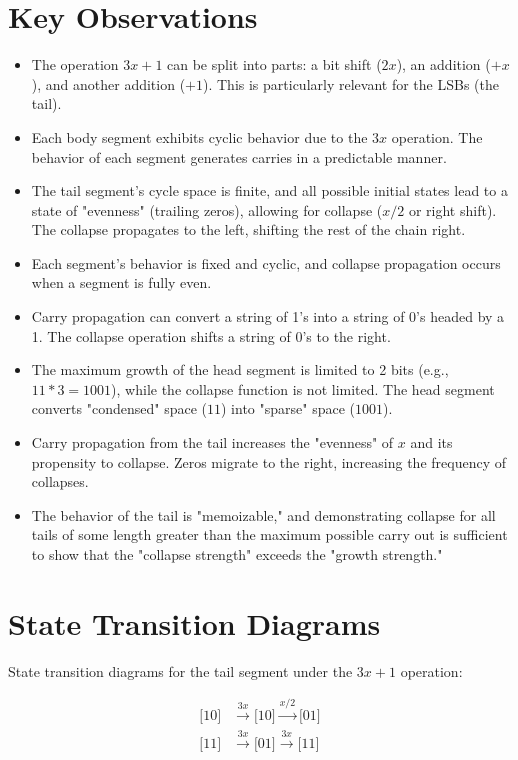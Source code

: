 \documentclass{article}
\begin{document}
\section{Key Observations}
\begin{itemize}
\item The operation $3x + 1$ can be split into parts: a bit shift ($2x$), an addition ($+x$), and another addition ($+1$). This is particularly relevant for the LSBs (the tail).
\item Each body segment exhibits cyclic behavior due to the $3x$ operation. The behavior of each segment generates carries in a predictable manner.
\item The tail segment's cycle space is finite, and all possible initial states lead to a state of "evenness" (trailing zeros), allowing for collapse ($x/2$ or right shift). The collapse propagates to the left, shifting the rest of the chain right.
\item Each segment's behavior is fixed and cyclic, and collapse propagation occurs when a segment is fully even.
\item Carry propagation can convert a string of 1's into a string of 0's headed by a 1. The collapse operation shifts a string of 0's to the right.
\item The maximum growth of the head segment is limited to 2 bits (e.g., $11 * 3 = 1001$), while the collapse function is not limited. The head segment converts "condensed" space ($11$) into "sparse" space ($1001$).
\item Carry propagation from the tail increases the "evenness" of $x$ and its propensity to collapse. Zeros migrate to the right, increasing the frequency of collapses.
\item The behavior of the tail is "memoizable," and demonstrating collapse for all tails of some length greater than the maximum possible carry out is sufficient to show that the "collapse strength" exceeds the "growth strength."
\end{itemize}

\section{State Transition Diagrams}
State transition diagrams for the tail segment under the $3x + 1$ operation:

\begin{align*}
\text{[10]} &\xrightarrow{3x} \text{[10]} \xrightarrow{x/2} \text{[01]} \\
\text{[11]} &\xrightarrow{3x} \text{[01]} \xrightarrow{3x} \text{[11]}
\end{align*}
\end{document}
